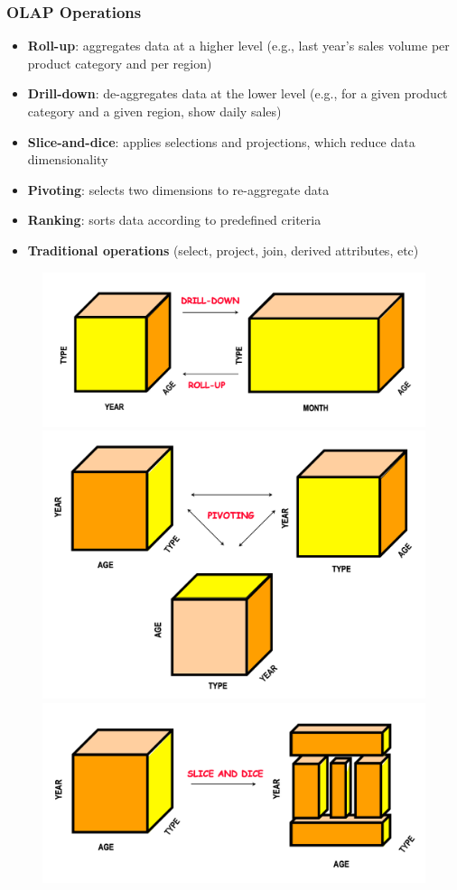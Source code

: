 \documentclass[10pt,a4paper]{article}
\begin{document}
\begin{justify}
\subsubsection{OLAP Operations}
\begin{itemize}
	\item \textbf{Roll-up}: aggregates data at a higher level (e.g., last year's sales volume per product category and per region)
	\item \textbf{Drill-down}: de-aggregates data at the lower level (e.g., for a given product category and a given region, show daily sales)
	\item \textbf{Slice-and-dice}: applies selections and projections, which reduce data dimensionality
	\item \textbf{Pivoting}: selects two dimensions to re-aggregate data
	\item \textbf{Ranking}: sorts data according to predefined criteria
	\item \textbf{Traditional operations} (select, project, join, derived attributes, etc)
\end{itemize}
\begin{figure}[htp]
\centering
\includegraphics[width=.3\textwidth]{images/olap1}\hfill
\includegraphics[width=.3\textwidth]{images/olap2}\hfill
\includegraphics[width=.3\textwidth]{images/olap3}\hfill
\end{figure}

\end{justify}
\end{document}
